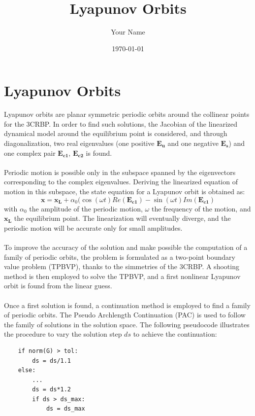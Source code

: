 \documentclass{report}
\title{#1}
\author{#2}
\date{#3}
\newcommand{\report}[3]{
    \title{#1}
    \author{#2}
    \date{#3}
    \maketitle
}
\begin{document}
\report{Lyapunov Orbits}{Your Name}{\today}


\newpage

\section*{Lyapunov Orbits}
Lyapunov orbits are planar symmetric periodic orbits around the collinear points for the 3CRBP.
In order to find such solutions, the Jacobian of the linearized dynamical model around the 
equilibrium point is considered, and through diagonalization, 
two real eigenvalues (one positive $\boldsymbol{E_u}$ and one negative $\boldsymbol{E_s}$) 
and one complex pair $\boldsymbol{E_{c1}}$, $\boldsymbol{E_{c2}}$ is found.\\\\
Periodic motion is possible only in the subspace spanned by the eigenvectors corresponding to the complex eigenvalues.
Deriving the linearized equation of motion in this subspace, the state equation for a Lyapunov orbit is obtained as:
\begin{equation}
    \boldsymbol{x} = \boldsymbol{x_L} + \alpha_0(\cos(\omega t)Re({\boldsymbol{E_{c1}}}) - \sin(\omega t)Im({\boldsymbol{E_{c1}}})
\end{equation}
with $\alpha_0$ the amplitude of the periodic motion, $\omega$ the frequency of the motion, and $\boldsymbol{x_L}$ the equilibrium point.
The linearization will eventually diverge, and the periodic motion will be accurate only for small amplitudes. \\\\
To improve the accuracy of the solution and make possible the computation of a family of periodic orbits, the problem is formulated as a two-point boundary value problem (TPBVP), thanks to the simmetries of the 3CRBP.
A shooting method is then employed to solve the TPBVP, and a first nonlinear Lyapunov orbit is found from the linear guess.\\\\
Once a first solution is found, a continuation method is employed to find a family of periodic orbits. The Pseudo Archlength Continuation (PAC) is used to follow the family of solutions in the solution space. The following pseudocode illustrates the procedure to 
vary the solution step $d s$ to achieve the continuation:
\begin{verbatim}
    if norm(G) > tol:
        ds = ds/1.1
    else:
        ...
        ds = ds*1.2
        if ds > ds_max:
            ds = ds_max
\end{verbatim}
\end{document}
